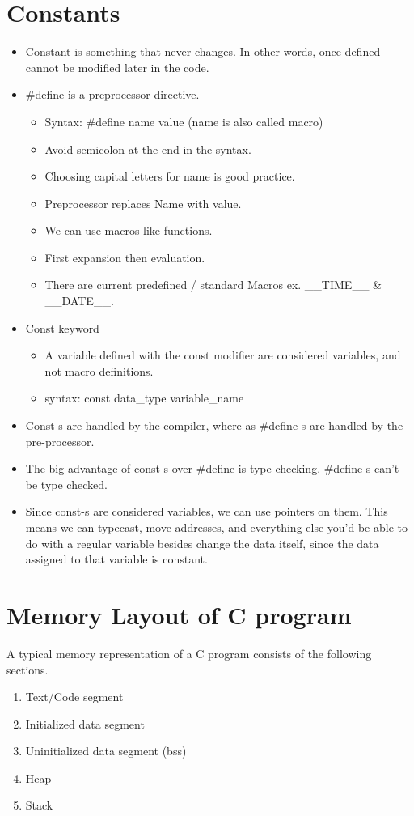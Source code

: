 \documentclass[12pt, a4paper]{article}
\begin{document}
    \section{Constants}
    \begin{itemize}
        \item Constant is something that never changes. In other words, once defined cannot be modified later in the code.
        \item \#define is a preprocessor directive.
        \begin{itemize}
            \item Syntax: \#define name value (name is also called macro)
            \item Avoid semicolon at the end in the syntax.
            \item Choosing capital letters for name is good practice.
            \item Preprocessor replaces Name with value.
            \item We can use macros like functions.
            \item First expansion then evaluation.
            \item There are current predefined / standard Macros ex. \_\_TIME\_\_ \& \_\_DATE\_\_.
        \end{itemize}
        \item Const keyword
        \begin{itemize}
            \item A variable defined with the const modifier are considered variables, and not macro definitions. 
            \item syntax: const data\_type variable\_name
        \end{itemize}
        \item Const-s are handled by the compiler, where as \#define-s are handled by the pre-processor.
        \item The big advantage of const-s over \#define is type checking. \#define-s can't be type checked.
        \item Since const-s are considered variables, we can use pointers on them. This means we can typecast, move addresses, and everything else you'd be able to do with a regular variable besides change the data itself, since the data assigned to that variable is constant.
    \end{itemize}

    \clearpage

    \section{Memory Layout of C program}
    A typical memory representation of a C program consists of the following sections.
    \begin{enumerate}
        \item Text/Code segment  
        \item Initialized data segment 
        \item Uninitialized data segment  (bss)
        \item Heap 
        \item Stack
    \end{enumerate}
\end{document}
